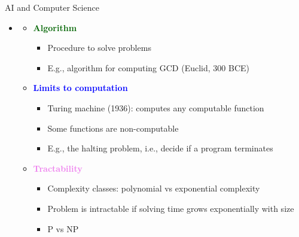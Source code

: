 \documentclass[
  10pt,
  ignorenonframetext,
]{beamer}
\providecommand{\tightlist}{%
  \setlength{\itemsep}{0pt}\setlength{\parskip}{0pt}}
\begin{document}
\begin{frame}{AI and Computer Science}
\label{ai-and-computer-science}
\begin{itemize}
\tightlist
\item
  \textbf{\textcolor{red}{\textcolor{black}{}}}

  \begin{itemize}
  \tightlist
  \item
    \textbf{\textcolor{darkgreen}{Algorithm}}

    \begin{itemize}
    \tightlist
    \item
      Procedure to solve problems
    \item
      E.g., algorithm for computing GCD (Euclid, 300 BCE)
    \end{itemize}
  \item
    \textbf{\textcolor{blue}{Limits to computation}}

    \begin{itemize}
    \tightlist
    \item
      Turing machine (1936): computes any computable function
    \item
      Some functions are non-computable
    \item
      E.g., the halting problem, i.e., decide if a program terminates
    \end{itemize}
  \item
    \textbf{\textcolor{violet}{Tractability}}

    \begin{itemize}
    \tightlist
    \item
      Complexity classes: polynomial vs exponential complexity
    \item
      Problem is intractable if solving time grows exponentially with
      size
    \item
      P vs NP
    \end{itemize}
  \end{itemize}
\end{itemize}
\end{frame}
\end{document}
